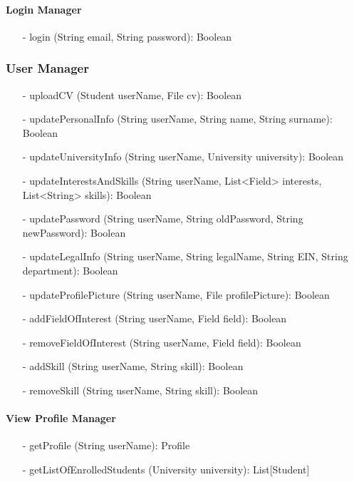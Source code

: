 \paragraph{Login Manager}
\begin{itemize}
    \item[-] login (String email, String password): Boolean
\end{itemize}


\subsubsection{User Manager}
\begin{itemize}
    \item[-] uploadCV (Student userName, File cv): Boolean
    \item[-] updatePersonalInfo (String userName, String name, String surname): Boolean
    \item[-] updateUniversityInfo (String userName, University university): Boolean
    \item[-] updateInterestsAndSkills (String userName, List<Field> interests, List<String> skills): Boolean
    \item[-] updatePassword (String userName, String oldPassword, String newPassword): Boolean
    \item[-] updateLegalInfo (String userName, String legalName, String EIN, String department): Boolean
    \item[-] updateProfilePicture (String userName, File profilePicture): Boolean
    \item[-] addFieldOfInterest (String userName, Field field): Boolean
    \item[-] removeFieldOfInterest (String userName, Field field): Boolean
    \item[-] addSkill (String userName, String skill): Boolean
    \item[-] removeSkill (String userName, String skill): Boolean
\end{itemize}

\paragraph{View Profile Manager}
\begin{itemize}
    \item[-] getProfile (String userName): Profile
    \item[-] getListOfEnrolledStudents (University university): List[Student]
\end{itemize}


